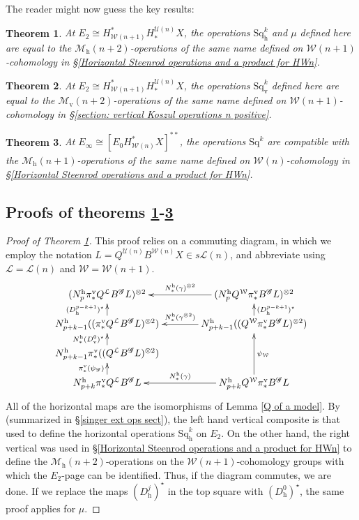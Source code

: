 \documentclass[11pt]{amsart} \renewcommand{\baselinestretch}{1.2}
\theoremstyle{plain}
\newtheorem{thm}{Theorem}[section] %
\numberwithin{equation}{section} %
\theoremstyle{plain}
\newtheorem{thm}{Theorem}[chapter] %
\numberwithin{equation}{chapter} %
\newcommand{\scrG}{\mathscr{G}}
\newcommand{\calU}{\mathcal{U}}
\newcommand{\calL}{\mathcal{L}}
\newcommand{\calw}{\mathcal{W}}
\newcommand{\calMv}{\mathcal{M}\dver}
\newcommand{\calMh}{\mathcal{M}\dhor}
\newcommand{\BSW}{{\scrG}}
\newcommand{\BSWres}{B^\BSW}%
\newcommand{\Sq}{\mathrm{Sq}}
\newcommand{\Edown}[4]{[E_{#1}#2]^{#3}_{#4}}
\newcommand{\uver}{^\mathrm{v}}
\newcommand{\uhor}{^\mathrm{h}}
\newcommand{\dver}{_\mathrm{v}}
\newcommand{\dhor}{_\mathrm{h}}
\newcommand{\Sqh}{\mathrm{Sq}\dhor}
\newcommand{\Sqv}{\mathrm{Sq}\dver}
\newcommand{\SubsectionOrSection}[1]{\subsection{#1}}
\begin{document}
\begin{Operations in composite functor spectral sequences}
The reader might now guess the key results:
\begin{thm}
\label{E2CompFuncLieOperationsID}
At $E_2\cong H^*_{\calw(n+1)}H_*^{\calU(n)}X$, the operations $\Sqh^k$ and $\mu$ defined here are equal to the $\calMh(n+2)$-operations of the same name defined on $\calw(n+1)$-cohomology in
\S\ref{Horizontal Steenrod operations and a product for HWn}.
\end{thm}
\begin{thm}
\label{E2CompFuncKosOperationsID}
At $E_2\cong H^*_{\calw(n+1)}H_*^{\calU(n)}X$, the operations $\Sqv^k$ defined here are equal to the $\calMv(n+2)$-operations of the same name defined on $\calw(n+1)$-cohomology in
\S\ref{section: vertical Koszul operations n positive}.
\end{thm}
\begin{thm}
\label{EInftyCompFuncOperationsID}
At $E_\infty \cong \Edown{0}{H^*_{\calw(n)}X}{**}{}$, the operations $\Sq^k$ are compatible with the
$\calMh(n+1)$-operations of the same name defined on $\calw(n)$-cohomology in
\S\ref{Horizontal Steenrod operations and a product for HWn}.
%
\end{thm} 
\SubsectionOrSection{Proofs of theorems \ref{E2CompFuncLieOperationsID}-\ref{EInftyCompFuncOperationsID}}

\begin{proof}[Proof of Theorem \ref{E2CompFuncLieOperationsID}]
This proof relies on a commuting diagram, in which we employ the  notation $L=Q^{\calU(n)} B^{\calw(n)}X \in s\calL(n)$, and abbreviate using $\calL=\calL(n)$ and $\calw=\calw(n+1)$.
\[\xymatrix@C=13mm@R=4mm{
(N\uhor_p\pi\uver_*Q^{\calL}\BSWres L)^{\otimes2}&%
(N\uhor_pQ^{\calw}\pi\uver_*\BSWres L)^{\otimes2}
\ar[l]_-{N\uhor_*(\gamma)^{\otimes 2}}
\\%
N\uhor_{p+k-1}((\pi\uver_*Q^{\calL}\BSWres L)^{\otimes2})
\ar[u]^-{(D\dhor^{p-k+1})^\star}
&%
N\uhor_{p+k-1}((Q^{\calw}\pi\uver_*\BSWres L)^{\otimes2})
\ar[u]_-{(D\dhor^{p-k+1})^\star}
\ar[l]_-{N\uhor_*(\gamma^{\otimes 2})}
\\%
N\uhor_{p+k-1}\pi\uver_*((Q^{\calL}\BSWres L)^{\otimes2})
\ar[u]^-{N\uhor_*(D\dver^0)^\star}
&%
\\%
N\uhor_{p+k}\pi\uver_* Q^{\calL}\BSWres L
\ar[u]^-{\pi\uver_*(\psi_\BSW)}
&%
N\uhor_{p+k}Q^{\calw}\pi\uver_* \BSWres L
\ar[uu]_-{\psi_{\calw}}
\ar[l]_-{N\uhor_*(\gamma)}
}\]
All of the horizontal maps are the isomorphisms of Lemma \ref{Q of a model}. By \cite[Theorem 2.23]{MR2245560} (summarized in \S\ref{singer ext ops sect}),  the left hand vertical composite is that used to define the horizontal operations $\Sqh^{k}$ on $E_2$. On the other hand, the right vertical was used in \S\ref{Horizontal Steenrod operations and a product for HWn} to define the $\calMh(n+2)$-operations on the $\calw(n+1)$-cohomology groups with which the $E_2$-page can be identified. Thus, if the diagram commutes, we are done. If we replace the maps $(D\dhor^j)^\star$ in the top square with $(D\dhor^0)^\star$, the same proof applies for $\mu$.


\end{proof}
\end{Operations in composite functor spectral sequences}
\end{document}

